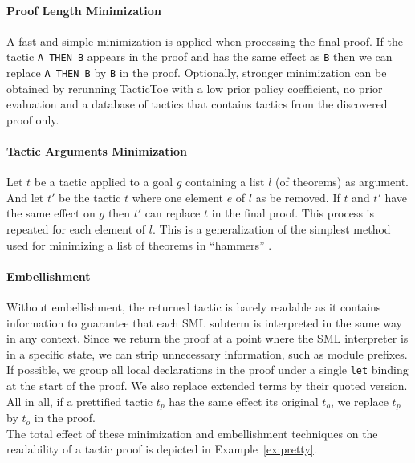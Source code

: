 \documentclass[runningheads,a4paper,draft]{svjour3}
\def\sml{\textsf{SML}\xspace}
\def\tactictoe{\textsf{TacticToe}\xspace}
\begin{document}
\paragraph{Proof Length Minimization}
A fast and simple minimization is applied when processing the final proof. If
the tactic \texttt{A THEN B} appears in the proof and has the same effect as
\texttt{B} then we can replace \texttt{A THEN B} by \texttt{B} in the proof.
Optionally, stronger minimization can be obtained
by rerunning \tactictoe with a low prior
policy coefficient, no prior evaluation and a database of tactics that contains
tactics from the discovered proof only.

\paragraph{Tactic Arguments Minimization}
Let $t$ be a tactic applied to a goal $g$ containing a list $l$ (of theorems)
as argument. And let $t'$ be the tactic $t$ where one element $e$ of $l$ as be
removed. If $t$ and $t'$ have the same effect on $g$ then $t'$ can replace $t$
in the final proof. This process is repeated for each element of $l$.
This is a generalization of the simplest method used for minimizing a list of
theorems in ``hammers'' \cite{hammers4qed}.

\paragraph{Embellishment}
Without embellishment, the returned tactic is barely readable as it contains
information to guarantee that each \sml subterm is interpreted in the same way 
in any context. Since we return the proof at a point where the \sml interpreter 
is
in a specific state, we can strip unnecessary information, such as
module prefixes. If possible, we group all local declarations in the
proof under a single \texttt{let} binding at the start of the proof. We
also replace extended terms by their quoted version.
All in all, if a prettified tactic $t_p$ has the same effect its original
$t_o$, we replace $t_p$ by $t_o$ in the proof.\\

The total effect of these minimization and embellishment techniques
on the readability of a tactic proof is depicted in
Example~\ref{ex:pretty}.
\end{document}
